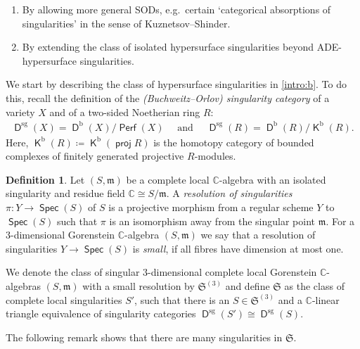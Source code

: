 \documentclass[reqno, 12pt, a4paper, twosided, english]{amsart}
\theoremstyle{plain}
\theoremstyle{definition}
\newtheorem{defn}[thm]{Definition}
\theoremstyle{remark}
\newtheorem*{Key Statement}{Key Statement}
\DeclareMathOperator{\Perf}{\mathsf{Perf}}
\newcommand{\SMAL}{\mathfrak{S}}
\DeclareMathOperator{\Spec}{\mathsf{Spec}}
\newcommand{\opname}[1]{\operatorname{\mathsf{#1}}}
\newcommand{\proj}{\opname{proj}\nolimits}
\newcommand{\C}{\mathbb{C}}
\newcommand{\SODs}{SODs\xspace}  %
\newcommand{\Dsg}{\opname{D}^{\mathrm{sg}}}
\newcommand{\Db}{\opname{D}^{\mathrm{b}}}
\newcommand{\Kb}{\opname{K}^{\mathrm{b}}}
\begin{document}
\begin{enumerate}[label={(\alph*)}]
    \item\label{intro:a} By allowing more general \SODs, e.g.\ certain `categorical absorptions of singularities' in the sense of Kuznetsov--Shinder. 
    \item\label{intro:b} By extending the class of isolated hypersurface singularities beyond ADE-hypersurface singularities.
\end{enumerate}
 

We start by describing the class of hypersurface singularities in \ref{intro:b}. To do this, recall the definition of the \emph{(Buchweitz--Orlov) singularity category} of a variety $X$ and of a two-sided Noetherian ring $R$:
\begin{align}\label{eq:singularitycategory}
     \Dsg(X)=\Db(X)/\Perf(X) \quad \text{  and  } \quad \Dsg(R)=\Db(R)/\Kb(R).
\end{align}
Here, $\Kb(R) \coloneqq \Kb(\proj R)$ is the homotopy category of bounded complexes of finitely generated projective $R$-modules.
\begin{defn} \label{D:frakS}
    {Let $(S, \mathfrak{m})$ be a complete local $\C$-algebra with an isolated singularity and residue field $\C \cong S/\mathfrak{m}$. 
    A \emph{resolution of singularities} $\pi : Y \to \Spec(S)$ of $S$ is a projective morphism from a regular scheme $Y$ to $\Spec (S)$ such that $\pi$ is an isomorphism away from the singular point $\mathfrak{m}$.
    For a $3$-dimensional Gorenstein $\mathbb{C}$-algebra $(S , \mathfrak{m})$ we say that a resolution of singularities $Y \to \Spec(S)$ is \emph{small}, if all fibres have dimension at most one.}
    

 We denote the class of singular $3$-dimensional %
 complete local 
 Gorenstein $\mathbb{C}$-alge\-bras $(S , \mathfrak{m})$ with a small resolution by $\SMAL^{(3)}$ and define $\SMAL$ as the class of complete local singularities $S'$, such that there is an $S \in \SMAL^{(3)}$ and a $\C$-linear triangle equivalence of singularity categories $\Dsg(S') \cong \Dsg(S)$.

 
\end{defn}

The following remark shows that there are many singularities in $\SMAL$.
\end{document}

